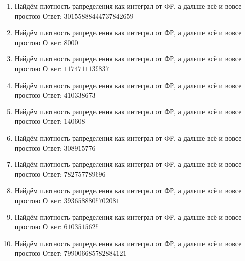 \documentclass[a4paper,12pt]{article}
\begin{document}
\begin{enumerate}
\item


Найдём плотность рапределения как интеграл от ФР, а дальше всё и вовсе простою Ответ: $30155888444737842659$



\item


Найдём плотность рапределения как интеграл от ФР, а дальше всё и вовсе простою Ответ: $8000$



\item


Найдём плотность рапределения как интеграл от ФР, а дальше всё и вовсе простою Ответ: $1174711139837$



\item


Найдём плотность рапределения как интеграл от ФР, а дальше всё и вовсе простою Ответ: $410338673$



\item


Найдём плотность рапределения как интеграл от ФР, а дальше всё и вовсе простою Ответ: $140608$



\item


Найдём плотность рапределения как интеграл от ФР, а дальше всё и вовсе простою Ответ: $308915776$



\item


Найдём плотность рапределения как интеграл от ФР, а дальше всё и вовсе простою Ответ: $782757789696$



\item


Найдём плотность рапределения как интеграл от ФР, а дальше всё и вовсе простою Ответ: $3936588805702081$



\item


Найдём плотность рапределения как интеграл от ФР, а дальше всё и вовсе простою Ответ: $6103515625$



\item


Найдём плотность рапределения как интеграл от ФР, а дальше всё и вовсе простою Ответ: $799006685782884121$




\end{enumerate}
\end{document}
